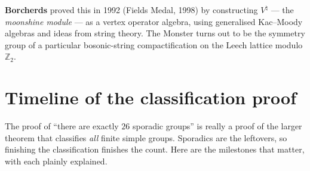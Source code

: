 \documentclass[11pt]{article}
\newcommand{\Z}{\mathbb{Z}}
\begin{document}
\textbf{Borcherds} proved this in 1992 (Fields Medal, 1998) by
constructing $V^{\natural}$ --- the \emph{moonshine module} --- as a
vertex operator algebra, using generalised Kac--Moody algebras and
ideas from string theory. The Monster turns out to be the symmetry
group of a particular bosonic-string compactification on the Leech
lattice modulo $\Z_2$.

\section*{Timeline of the classification proof}

The proof of ``there are exactly $26$ sporadic groups'' is really a
proof of the larger theorem that classifies \emph{all} finite simple
groups. Sporadics are the leftovers, so finishing the classification
finishes the count. Here are the milestones that matter, with each
plainly explained.
\end{document}

